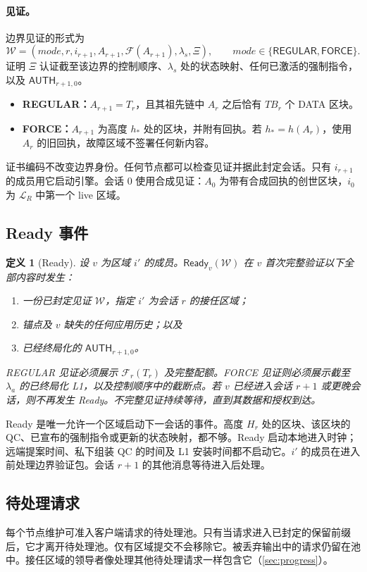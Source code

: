\documentclass[11pt,a4paper]{article}
\newcommand{\FC}{\mathcal F}
\newcommand{\TB}{\mathit{TB}}
\newcommand{\tagg}[1]{\ensuremath{\mathsf{#1}}}
\newtheorem{definition}{定义}[section]
\begin{document}
\paragraph{见证。}
边界见证的形式为
\[
 \mathcal W=(\mathit{mode},r,i_{r+1},A_{r+1},\FC(A_{r+1}),\lambda_s,\Xi),
 \qquad \mathit{mode}\in\{\tagg{REGULAR},\tagg{FORCE}\}.
\]
证明 $\Xi$ 认证截至该边界的控制顺序、$\lambda_s$ 处的状态映射、任何已激活的强制指令，以及 $\tagg{AUTH}_{r+1,0}$。
\begin{itemize}
\item \textbf{REGULAR：}$A_{r+1}=T_r$，且其祖先链中 $A_r$ 之后恰有 $\TB_r$ 个 DATA 区块。
\item \textbf{FORCE：}$A_{r+1}$ 为高度 $h_*$ 处的区块，并附有回执。若 $h_*=h(A_r)$，使用 $A_r$ 的旧回执，故障区域不签署任何新内容。
\end{itemize}
证书编码不改变边界身份。任何节点都可以检查见证并据此封定会话。只有 $i_{r+1}$ 的成员用它启动引擎。会话 $0$ 使用合成见证：$A_0$ 为带有合成回执的创世区块，$i_0$ 为 $\mathcal L_R$ 中第一个 live 区域。

\subsection{Ready 事件}\label{sec:ready}
\begin{definition}[Ready]\label{def:ready}
设 $v$ 为区域 $i'$ 的成员。$\tagg{Ready}_v(\mathcal W)$ 在 $v$ 首次完整验证以下全部内容时发生：
\begin{enumerate}[label=(\roman*)]
\item 一份已封定见证 $\mathcal W$，指定 $i'$ 为会话 $r$ 的接任区域；
\item 锚点及 $v$ 缺失的任何应用历史；以及
\item 已经终局化的 $\tagg{AUTH}_{r+1,0}$。
\end{enumerate}
REGULAR 见证必须展示 $\FC_r(T_r)$ 及完整配额。FORCE 见证则必须展示截至 $\lambda_a$ 的已终局化 L1，以及控制顺序中的截断点。若 $v$ 已经进入会话 $r+1$ 或更晚会话，则不再发生 Ready。不完整见证持续等待，直到其数据和授权到达。
\end{definition}
Ready 是唯一允许一个区域启动下一会话的事件。高度 $H_r$ 处的区块、该区块的 QC、已宣布的强制指令或更新的状态映射，都不够。Ready 启动本地进入时钟；远端提案时间、私下组装 QC 的时间及 L1 安装时间都不启动它。$i'$ 的成员在进入前处理边界验证包。会话 $r+1$ 的其他消息等待进入后处理。

\subsection{待处理请求}\label{sec:requests}
每个节点维护可准入客户端请求的待处理池。只有当请求进入已封定的保留前缀后，它才离开待处理池。仅有区域提交不会移除它。被丢弃输出中的请求仍留在池中。接任区域的领导者像处理其他待处理请求一样包含它（\cref{sec:progress}）。
\end{document}
